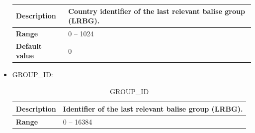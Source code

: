 \begin{itemize}
\begin{longtable}{|l|l|}
					\begin{minipage}[t]{0.22\linewidth} \textbf{Description} \end{minipage}
				&	\begin{minipage}[t]{0.78\linewidth} Country identifier of the last relevant balise group (LRBG). \end{minipage} \\

				\hline

					\begin{minipage}[t]{0.22\linewidth} \textbf{Range} \end{minipage}
				&	\begin{minipage}[t]{0.78\linewidth} 0 – 1024 \end{minipage} \\

				\hline

					\begin{minipage}[t]{0.22\linewidth} \textbf{Default value} \end{minipage}
				&	\begin{minipage}[t]{0.78\linewidth} 0 \end{minipage} \\

				\hline

			\end{longtable}

		\item GROUP\_ID:

			\begin{longtable}{|l|l|}
				\caption{GROUP\_ID}\\
				\hline

					\begin{minipage}[t]{0.22\linewidth} \textbf{Description} \end{minipage}
				&	\begin{minipage}[t]{0.78\linewidth} Identifier of the last relevant balise group (LRBG). \end{minipage} \\

				\hline

					\begin{minipage}[t]{0.22\linewidth} \textbf{Range} \end{minipage}
				&	\begin{minipage}[t]{0.78\linewidth} 0 – 16384 \end{minipage} \\


\end{longtable}
\end{itemize}
